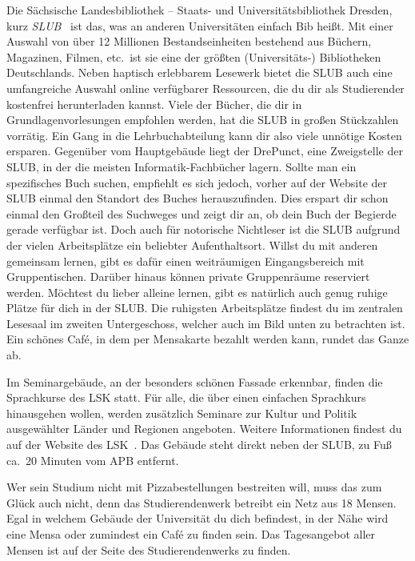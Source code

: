 \label{sec:slub}
Die Sächsische Landesbibliothek – Staats- und Universitätsbibliothek Dresden, kurz \emph{SLUB}~ ist das, was an anderen Universitäten einfach Bib heißt.
Mit einer Auswahl von über 12 Millionen Bestandseinheiten bestehend aus Büchern, Magazinen, Filmen, etc.\ ist sie eine der größten (Universitäts-) Bibliotheken Deutschlands.
Neben haptisch erlebbarem Lesewerk bietet die SLUB auch eine umfangreiche Auswahl online verfügbarer Ressourcen, die du dir als Studierender kostenfrei herunterladen kannst.
Viele der Bücher, die dir in Grundlagenvorlesungen empfohlen werden, hat die SLUB in großen Stückzahlen vorrätig. Ein Gang in die Lehrbuchabteilung kann dir also viele unnötige Kosten ersparen.
Gegenüber vom Hauptgebäude liegt der DrePunct, eine Zweigstelle der SLUB, in der die meisten Informatik-Fachbücher lagern. Sollte man ein spezifisches Buch suchen, empfiehlt es sich jedoch, vorher auf der Website der
SLUB einmal den Standort des Buches herauszufinden. Dies erspart dir schon einmal den Großteil des Suchweges und zeigt dir an, ob dein Buch der Begierde gerade verfügbar ist.\newline
Doch auch für notorische Nichtleser ist die SLUB aufgrund der vielen Arbeitsplätze ein beliebter Aufenthaltsort.
Willst du mit anderen gemeinsam lernen, gibt es dafür einen weiträumigen Eingangsbereich mit Gruppentischen.
Darüber hinaus können private Gruppenräume reserviert werden. Möchtest du lieber alleine lernen, gibt es natürlich auch genug ruhige Plätze für dich in der SLUB\@. Die ruhigsten Arbeitsplätze findest du im zentralen Lesesaal
im zweiten Untergeschoss, welcher auch im Bild unten zu betrachten ist. Ein schönes Café, in dem per Mensakarte bezahlt werden kann, rundet das Ganze ab.

\newpage
{}
Im Seminargebäude, an der besonders schönen Fassade erkennbar, finden die Sprachkurse des LSK statt.
Für alle, die über einen einfachen Sprachkurs hinausgehen wollen, werden zusätzlich Seminare zur Kultur und Politik ausgewählter Länder und Regionen angeboten.
Weitere Informationen findest du auf der Website des LSK~.
Das Gebäude steht direkt neben der SLUB, zu Fuß ca.\ 20 Minuten vom APB entfernt.

Wer sein Studium nicht mit Pizzabestellungen bestreiten will, muss das zum Glück auch nicht, denn das Studierendenwerk betreibt ein Netz aus 18 Mensen.
Egal in welchem Gebäude der Universität du dich befindest, in der Nähe wird eine Mensa oder zumindest ein Café zu finden sein.
Das Tagesangebot aller Mensen ist auf der Seite des Studierendenwerks  zu finden.

